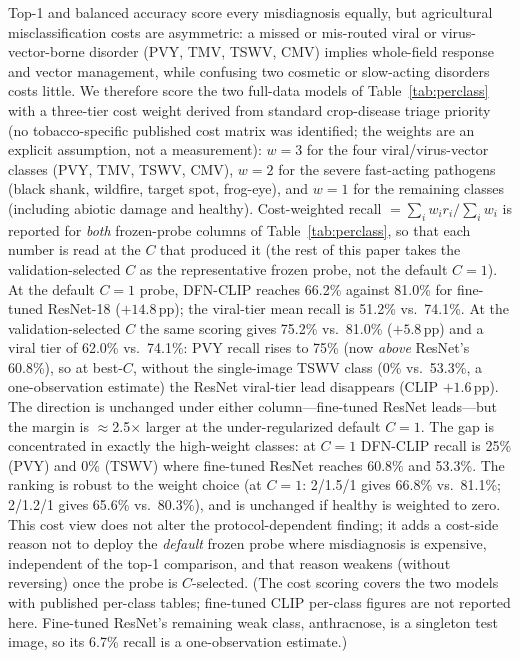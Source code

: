 \documentclass[10pt,a4paper]{article}
\begin{document}
Top-1 and balanced accuracy score every misdiagnosis equally, but agricultural misclassification costs are asymmetric: a missed or mis-routed viral or virus-vector-borne disorder (PVY, TMV, TSWV, CMV) implies whole-field response and vector management, while confusing two cosmetic or slow-acting disorders costs little. We therefore score the two full-data models of Table~\ref{tab:perclass} with a three-tier cost weight derived from standard crop-disease triage priority (no tobacco-specific published cost matrix was identified; the weights are an explicit assumption, not a measurement): $w{=}3$ for the four viral/virus-vector classes (PVY, TMV, TSWV, CMV), $w{=}2$ for the severe fast-acting pathogens (black shank, wildfire, target spot, frog-eye), and $w{=}1$ for the remaining classes (including abiotic damage and healthy). Cost-weighted recall $=\sum_i w_i r_i/\sum_i w_i$ is reported for \emph{both} frozen-probe columns of Table~\ref{tab:perclass}, so that each number is read at the $C$ that produced it (the rest of this paper takes the validation-selected $C$ as the representative frozen probe, not the default $C{=}1$). At the default $C{=}1$ probe, DFN-CLIP reaches 66.2\% against 81.0\% for fine-tuned ResNet-18 ($+14.8$\,pp); the viral-tier mean recall is 51.2\% vs.\ 74.1\%. At the validation-selected $C$ the same scoring gives 75.2\% vs.\ 81.0\% ($+5.8$\,pp) and a viral tier of 62.0\% vs.\ 74.1\%: PVY recall rises to 75\% (now \emph{above} ResNet's 60.8\%), so at best-$C$, without the single-image TSWV class (0\% vs.\ 53.3\%, a one-observation estimate) the ResNet viral-tier lead disappears (CLIP $+1.6$\,pp). The direction is unchanged under either column---fine-tuned ResNet leads---but the margin is $\approx$2.5$\times$ larger at the under-regularized default $C{=}1$. The gap is concentrated in exactly the high-weight classes: at $C{=}1$ DFN-CLIP recall is 25\% (PVY) and 0\% (TSWV) where fine-tuned ResNet reaches 60.8\% and 53.3\%. The ranking is robust to the weight choice (at $C{=}1$: 2/1.5/1 gives 66.8\% vs.\ 81.1\%; 2/1.2/1 gives 65.6\% vs.\ 80.3\%), and is unchanged if healthy is weighted to zero. This cost view does not alter the protocol-dependent finding; it adds a cost-side reason not to deploy the \emph{default} frozen probe where misdiagnosis is expensive, independent of the top-1 comparison, and that reason weakens (without reversing) once the probe is $C$-selected. (The cost scoring covers the two models with published per-class tables; fine-tuned CLIP per-class figures are not reported here. Fine-tuned ResNet's remaining weak class, anthracnose, is a singleton test image, so its 6.7\% recall is a one-observation estimate.)
\end{document}
